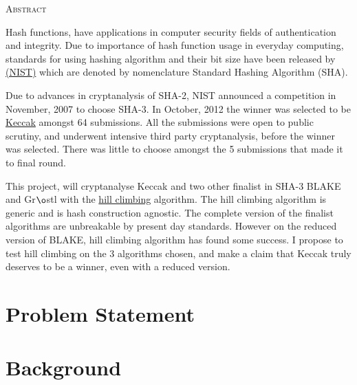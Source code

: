\documentclass[12pt]{artikel3}                  %
\begin{document}
\begin{center}
\parbox{350pt}{
  \begin{center}\textsc{Abstract}\end{center}
  \vspace{0.5cm}
  Hash functions, have applications in computer security fields of authentication and integrity.
  Due to importance of hash function usage in everyday computing, standards for using hashing 
  algorithm and their bit size have been released by \href{"http://www.nist.gov/index.html"}
  {(NIST)} which are denoted by nomenclature
  Standard Hashing Algorithm (SHA).

  Due to advances in cryptanalysis of SHA-2, NIST announced a competition in November, 2007 
  to choose SHA-3. In October, 2012 the winner was selected to be \href{"http://keccak.noekeon.org/"}
  {Keccak} amongst 64 submissions. All the submissions were open to public scrutiny, and underwent
  intensive third party cryptanalysis, before the winner was selected. There was little to choose
  amongst the 5 submissions that made it to final round. 

  This project, will cryptanalyse Keccak and two other finalist in SHA-3 BLAKE and Gr$\o$stl with the 
  \href{"http://csrc.nist.gov/groups/ST/hash/sha-3/Round2/Aug2010/documents/papers/TURAN\_Paper\_Erdener.pdf"}
  {hill climbing} algorithm. The hill climbing algorithm is generic and is hash construction agnostic.
  The complete version of the finalist algorithms are unbreakable by present day standards. However
  on the reduced version of BLAKE, hill climbing algorithm has found some success. I propose to test
  hill climbing on the 3 algorithms chosen, and make a claim that Keccak truly deserves to be a winner,
  even with a reduced version.
}
\end{center}

\clearpage

\section{Problem Statement}


\clearpage

\section{Background}
\end{document}
